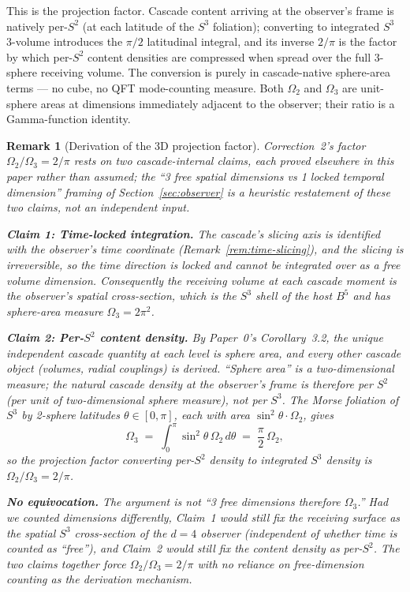 \documentclass[11pt,a4paper]{article}
\newtheorem{remark}[theorem]{Remark}
\begin{document}
This is the projection factor. Cascade content arriving at the
observer's frame is natively per-$S^2$ (at each latitude of the $S^3$
foliation); converting to integrated $S^3$ 3-volume introduces the
$\pi/2$ latitudinal integral, and its inverse $2/\pi$ is the factor by
which per-$S^2$ content densities are compressed when spread over the
full 3-sphere receiving volume. The conversion is purely in cascade-native
sphere-area terms --- no cube, no QFT mode-counting measure. Both
$\Omega_2$ and $\Omega_3$ are unit-sphere areas at dimensions
immediately adjacent to the observer; their ratio is a Gamma-function
identity.

\begin{remark}[Derivation of the 3D projection factor]\label{rem:why-3d}
Correction~2's factor $\Omega_2/\Omega_3 = 2/\pi$ rests on two
cascade-internal claims, each proved elsewhere in this paper rather
than assumed; the ``3 free spatial dimensions vs 1 locked temporal
dimension'' framing of Section~\ref{sec:observer} is a heuristic
restatement of these two claims, not an independent input.

\medskip\noindent\textbf{Claim 1: Time-locked integration.} The
cascade's slicing axis is identified with the observer's time
coordinate (Remark~\ref{rem:time-slicing}), and the slicing is
irreversible, so the time direction is locked and cannot be
integrated over as a free volume dimension. Consequently the
receiving volume at each cascade moment is the observer's spatial
cross-section, which is the $S^3$ shell of the host $B^5$ and has
sphere-area measure $\Omega_3 = 2\pi^2$.

\medskip\noindent\textbf{Claim 2: Per-$S^2$ content density.} By
Paper~0's Corollary~3.2, the unique independent cascade quantity at
each level is sphere area, and every other cascade object (volumes,
radial couplings) is derived. ``Sphere area'' is a two-dimensional
measure; the natural cascade density at the observer's frame is
therefore per $S^2$ (per unit of two-dimensional sphere measure),
not per $S^3$. The Morse foliation of $S^3$ by 2-sphere latitudes
$\theta\in[0,\pi]$, each with area $\sin^2\theta\cdot\Omega_2$,
gives
\[
\Omega_3 \;=\; \int_0^\pi \sin^2\theta\,\Omega_2\,d\theta
\;=\; \frac{\pi}{2}\,\Omega_2,
\]
so the projection factor converting per-$S^2$ density to integrated
$S^3$ density is $\Omega_2/\Omega_3 = 2/\pi$.

\medskip\noindent\textbf{No equivocation.} The argument is not
``3 free dimensions therefore $\Omega_3$.'' Had we counted
dimensions differently, Claim~1 would still fix the receiving
surface as the spatial $S^3$ cross-section of the $d{=}4$ observer
(independent of whether time is counted as ``free''), and Claim~2
would still fix the content density as per-$S^2$. The two claims
together force $\Omega_2/\Omega_3 = 2/\pi$ with no reliance on
free-dimension counting as the derivation mechanism.


\end{remark}
\end{document}
